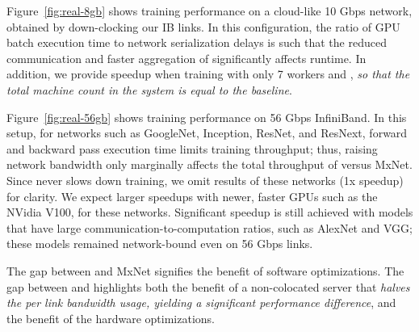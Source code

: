 Figure~\ref{fig:real-8gb} shows training performance on a cloud-like 10 Gbps network, obtained by down-clocking our IB links. In this configuration, the ratio of GPU batch execution time to network serialization delays is such that the reduced communication and faster aggregation of \pbox significantly affects runtime. In addition, we provide speedup when training with only 7 workers and \pbox, \textit{so that the total machine count in the system is equal to the baseline}.

Figure~\ref{fig:real-56gb} shows training performance on 56 Gbps InfiniBand.
In this setup, for networks such as GoogleNet, Inception, ResNet, and ResNext, forward and backward pass execution time limits training throughput; thus, raising network bandwidth only marginally affects the total throughput of \pbox versus MxNet. Since \phub never slows down training, we omit results of these networks (1x speedup) for clarity. We expect larger speedups with newer, faster GPUs such as the NVidia V100, for these networks. Significant speedup is still achieved with models that have large communication-to-computation ratios, such as AlexNet and VGG; these models remained network-bound even on 56 Gbps links.

The gap between \pshard and MxNet signifies the benefit of software optimizations. The gap between \pshard and \pbox highlights both the benefit of a non-colocated server that \textit{halves the per link bandwidth usage, yielding a significant performance difference}, and the benefit of the hardware optimizations.




